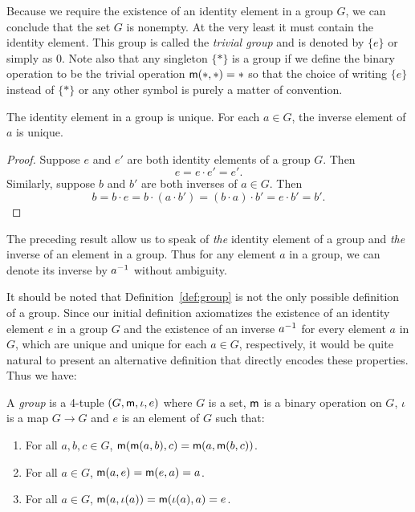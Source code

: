 Because we require the existence of an identity element in a group \(G\), we can
conclude that the set \(G\) is nonempty. At the very least it must contain the
identity element. This group is called the \emph{trivial group} and is denoted
by \(\{e\}\) or simply as \(0\). Note also that any singleton \(\{*\}\) is a
group if we define the binary operation to be the trivial operation \({\mathsf{m}}(*,
*) = *\) so that the choice of writing \(\{e\}\) instead of \(\{*\}\) or any
other symbol is purely a matter of convention.

\begin{theorem}
    The identity element in a group is unique. For each \(a \in G\), the inverse
    element of \(a\) is unique.
\end{theorem}

\begin{proof}
    Suppose \(e\) and \(e'\) are both identity elements of a group \(G\). Then
    \[
        e = e \cdot e' = e'.
    \]
    Similarly, suppose \(b\) and \(b'\) are both inverses of \(a \in G\). Then
    \[
        b = b \cdot e = b \cdot (a \cdot b') = (b \cdot a) \cdot b' = e \cdot b' = b'.
    \]
\end{proof}

The preceding result allow us to speak of \emph{the} identity element of a group
and \emph{the} inverse of an element in a group. Thus for any element \(a\) in a
group, we can denote its inverse by \(a^{-1}\) without ambiguity.

It should be noted that Definition~\ref{def:group} is not the only possible
definition of a group. Since our initial definition axiomatizes the existence of
an identity element \(e\) in a group \(G\) and the existence of an inverse
\(a^{-1}\) for every element \(a\) in \(G\), which are unique and unique for each
\(a\in G\), respectively, it would be quite natural to present an alternative
definition that directly encodes these properties. Thus we have:
\begin{definition}
    \label{def:group-4-tuple}
    A \emph{group} is a 4-tuple \((G, {\mathsf{m}}, \iota, e)\) where \(G\) is a set,
    \({\mathsf{m}}\) is a binary operation on \(G\), \(\iota\) is a map \(G \to G\) and
    \(e\) is an element of \(G\) such that:
    \begin{enumerate}[label=(\alph*), itemsep=0pt]
        \item For all \(a, b, c \in G\), \({\mathsf{m}}({\mathsf{m}}(a, b), c) = {\mathsf{m}}(a,
        {\mathsf{m}}(b, c))\).
        \item For all \(a \in G\), \({\mathsf{m}}(a, e) = {\mathsf{m}}(e, a) = a\).
        \item For all \(a \in G\), \({\mathsf{m}}(a, \iota(a)) = {\mathsf{m}}(\iota(a), a) =
        e\).
    \end{enumerate}
\end{definition}

